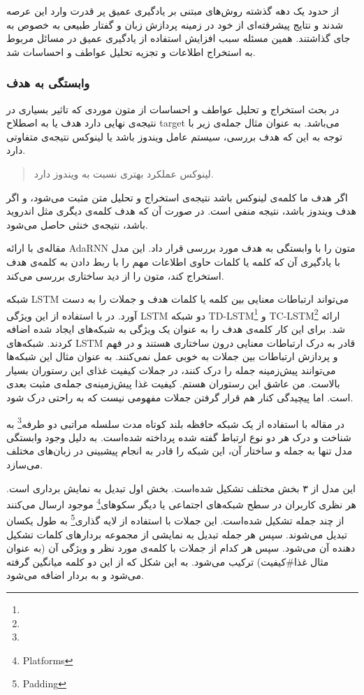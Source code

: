 \documentclass[12pt, a4paper, oneside]{report}
\begin{document}
از حدود یک دهه گذشته روش‌های مبتنی بر یادگیری عمیق پر قدرت وارد این عرصه شدند و نتایج پیشرفته‌ای
از خود در زمینه پردازش زبان و گفتار طبیعی به خصوص
به جای گذاشتند.
همین مسئله سبب افزایش استفاده از یادگیری عمیق در مسائل مربوط به استخراج اطلاعات و تجزیه تحلیل
عواطف و احساسات شد.
\cite{zhang2018deep}


\subsubsection{وابستگی به هدف}
در بحث استخراج و تحلیل عواطف و احساسات از متون موردی که تاثیر بسیاری در نتیجه‌ی نهایی دارد هدف یا به اصطلاح
target
می‌باشد. به عنوان مثال جمله‌ی زیر با توجه به این که هدف بررسی، سیستم عامل ویندوز باشد یا لینوکس نتیجه‌ی متفاوتی دارد.
\begin{quotation}
    لینوکس عملکرد بهتری نسبت به ویندوز دارد.
\end{quotation}
اگر هدف ما کلمه‌ی لینوکس باشد نتیجه‌ی استخراج و تحلیل متن مثبت می‌شود، و اگر هدف ویندوز باشد، نتیجه منفی است.
در صورت آن که هدف کلمه‌ی دیگری مثل اندروید باشد، نتیجه‌ی خنثی حاصل می‌شود.

مقاله‌ی
\cite{68dong-etal-2014-adaptive}
با ارائه
AdaRNN
متون را با وابستگی به هدف مورد بررسی قرار داد. این مدل با یادگیری آن که کلمه یا کلمات حاوی اطلاعات مهم را با
ربط دادن به کلمه‌ی هدف استخراج کند، متون را از دید ساختاری بررسی می‌کند.

شبکه
LSTM
می‌تواند ارتباطات معنایی بین کلمه‌ یا کلمات هدف و جملات را به دست آورد. در
\cite{70tang-etal-2016-effective}
با استفاده از این ویژگی
LSTM
دو شبکه
TD-LSTM\footnote{}
و
TC-LSTM\footnote{}
ارائه شد. برای این کار کلمه‌ی هدف را به عنوان یک ویژگی به شبکه‌های ایجاد شده اضافه کردند.
شبکه‌های
LSTM
قادر به درک ارتباطات معنایی درون ساختاری هستند و در فهم و پردازش ارتباطات بین جملات به خوبی عمل نمی‌کنند.
به عنوان مثال این شبکه‌ها می‌توانند پیش‌زمینه جمله را درک کنند، در جملات کیفیت غذای این رستوران بسیار بالاست.
من عاشق این رستوران هستم. کیفیت غذا پیش‌زمینه‌ی جمله‌ی مثبت بعدی است. اما پیچیدگی کنار هم
قرار گرفتن جملات مفهومی نیست که به راحتی درک شود.

در
\cite{71ruder-etal-2016-hierarchical}
مقاله با استفاده از یک شبکه حافظه بلند کوتاه مدت سلسله مراتبی دو طرفه\footnote{}
به شناخت و درک هر دو نوع ارتباط گفته شده پرداخته شده‌است. به دلیل وجود وابستگی مدل تنها به جمله و
ساختار آن، این شبکه را قادر به انجام پیشبینی در زبان‌های مختلف می‌سازد.

این مدل از ۳ بخش مختلف تشکیل شده‌است. بخش اول تبدیل به نمایش برداری است. هر نظری کاربران در سطح شبکه‌های
اجتماعی یا دیگر سکوهای\footnote{Platforms}
موجود ارسال می‌کنند از چند جمله تشکیل شده‌است. این جملات با استفاده از لایه گذاری\footnote{Padding}
به طول یکسان تبدیل می‌شوند. سپس هر جمله تبدیل به نمایشی از مجموعه بردارهای کلمات تشکیل دهنده آن می‌شود.
سپس هر کدام از جملات با کلمه‌ی مورد نظر و ویژگی آن (به عنوان مثال غذا\#کیفیت)
ترکیب می‌شود. به این شکل که از این دو کلمه میانگین گرفته می‌شود و به بردار اضافه می‌شود.
\end{document}
